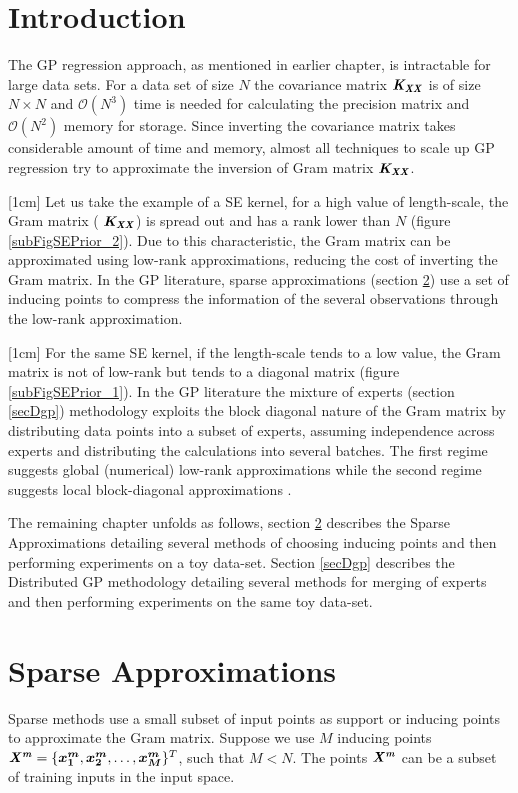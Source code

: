 
\section{Introduction}
The GP regression approach, as mentioned in earlier chapter, is intractable for large data sets. For a data set of size $N$ the covariance matrix $\bm{\mathit{K_{XX}}}$ is of size $N \times N$ and $\mathcal{O}\left ( N^{3} \right )$ time is needed for calculating the precision matrix and $\mathcal{O}\left ( N^{2} \right )$ memory for storage. Since inverting the covariance matrix takes considerable amount of time and memory, almost all techniques to scale up GP regression try to approximate the inversion of Gram matrix $\bm{\mathit{K_{XX}}}$. 

[1cm]
Let us take the example of a SE kernel, for a high value of length-scale, the Gram matrix ( $\bm{\mathit{K_{XX}}}$) is spread out and has a rank lower than  $N$ (figure \ref{subFigSEPrior_2}). Due to this characteristic, the Gram matrix can be approximated using low-rank approximations, reducing the cost of inverting the Gram matrix. In the GP literature, sparse approximations (section \ref{secSparseApprox}) use a set of inducing points to compress the information of the several observations through the low-rank approximation. 

[1cm]
For the same SE kernel, if the length-scale tends to a low value, the Gram matrix is not of low-rank but tends to a diagonal matrix (figure \ref{subFigSEPrior_1}). In the GP literature the mixture of experts (section \ref{secDgp}) methodology exploits the block diagonal nature of the Gram matrix by distributing data points into a subset of experts, assuming independence across experts and distributing the calculations into several batches. The first regime suggests global (numerical) low-rank approximations while the second regime suggests local block-diagonal approximations \cite{march2015askit, chenhan2016inv}. 

The remaining chapter unfolds as follows, section \ref{secSparseApprox} describes the Sparse Approximations detailing several methods of choosing inducing points and then performing experiments on a toy data-set. Section \ref{secDgp} describes the Distributed GP methodology detailing several methods for merging of experts and then performing experiments on the same toy data-set. 

\section{Sparse Approximations}\label{secSparseApprox}
Sparse methods use a small subset of input points as support or inducing points to approximate the Gram matrix. Suppose we use $M$ inducing points $\bm{\mathit{X^{m}}} = \{\boldsymbol{x^{m}_{1}}, \boldsymbol{x^{m}_{2}}, \ldots, \boldsymbol{x^{m}_{M}}\}^T$, such that $M < N$. The points $\bm{\mathit{X^{m}}}$ can be a subset of training inputs in the input space. 


